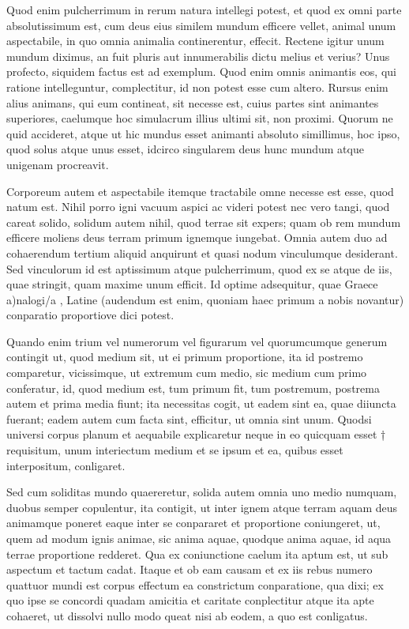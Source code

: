  Quod enim pulcherrimum in rerum natura intellegi potest, et quod ex omni parte absolutissimum est, cum deus eius similem mundum efficere vellet, animal unum aspectabile, in quo omnia animalia continerentur, effecit. Rectene igitur unum mundum diximus, an fuit pluris aut innumerabilis dictu melius et verius? Unus profecto, siquidem factus est ad exemplum. Quod enim omnis animantis eos, qui ratione intelleguntur, complectitur, id non potest esse cum altero. Rursus enim alius animans, qui eum contineat, sit necesse est, cuius partes sint animantes superiores, caelumque hoc simulacrum illius ultimi sit, non proximi. Quorum ne quid accideret, atque ut hic mundus esset animanti absoluto simillimus, hoc ipso, quod solus atque unus esset, idcirco singularem deus hunc mundum atque unigenam procreavit.

 Corporeum autem et aspectabile itemque tractabile omne necesse est esse, quod natum est. Nihil porro igni vacuum aspici ac videri potest nec vero tangi, quod careat solido, solidum autem nihil, quod terrae sit expers; quam ob rem mundum efficere moliens deus terram primum ignemque iungebat. Omnia autem duo ad cohaerendum tertium aliquid anquirunt et quasi nodum vinculumque desiderant. Sed vinculorum id est aptissimum atque pulcherrimum, quod ex se atque de iis, quae stringit, quam maxime unum efficit. Id optime adsequitur, quae Graece a)nalogi/a , Latine (audendum est enim, quoniam haec primum a nobis novantur) conparatio proportiove dici potest.

 Quando enim trium vel numerorum vel figurarum vel quorumcumque generum contingit ut, quod medium sit, ut ei primum proportione, ita id postremo comparetur, vicissimque, ut extremum cum medio, sic medium cum primo conferatur, id, quod medium est, tum primum fit, tum postremum, postrema autem et prima media fiunt; ita necessitas cogit, ut eadem sint ea, quae diiuncta fuerant; eadem autem cum facta sint, efficitur, ut omnia sint unum. Quodsi universi corpus planum et aequabile explicaretur neque in eo quicquam esset † requisitum, unum interiectum medium et se ipsum et ea, quibus esset interpositum, conligaret.

 Sed cum soliditas mundo quaereretur, solida autem omnia uno medio numquam, duobus semper copulentur, ita contigit, ut inter ignem atque terram aquam deus animamque poneret eaque inter se conpararet et proportione coniungeret, ut, quem ad modum ignis animae, sic anima aquae, quodque anima aquae, id aqua terrae proportione redderet. Qua ex coniunctione caelum ita aptum est, ut sub aspectum et tactum cadat. Itaque et ob eam causam et ex iis rebus numero quattuor mundi est corpus effectum ea constrictum conparatione, qua dixi; ex quo ipse se concordi quadam amicitia et caritate conplectitur atque ita apte cohaeret, ut dissolvi nullo modo queat nisi ab eodem, a quo est conligatus.

